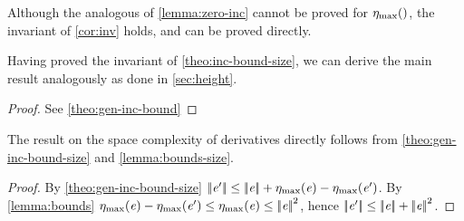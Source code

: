 Although the analogous of \cref{lemma:zero-inc} cannot be proved for ${\eta_{\max}}({})$, the invariant of \cref{cor:inv} holds, and can be proved directly.

Having proved the invariant of \cref{theo:inc-bound-size}, we can derive the main result analogously as done in \cref{sec:height}.
\begin{proof}
 See \cref{theo:gen-inc-bound}
\end{proof}

The result on the space complexity of derivatives directly follows from  \cref{theo:gen-inc-bound-size} and \cref{lemma:bounds-size}.


\begin{proof}
 By \cref{theo:gen-inc-bound-size} ${{\mid\!\mid}}{\mathit {e}'}{{\mid\!\mid}}\leq{{\mid\!\mid}}{\ensuremath{\mathit {e}}}{{\mid\!\mid}}+{\eta_{\max}}({\mathit {e}})-{\eta_{\max}}({\mathit {e}'})$. By \cref{lemma:bounds}
 ${\eta_{\max}}({\mathit {e}})-{\eta_{\max}}({\mathit {e}'})\leq{\eta_{\max}}({\mathit {e}})\leq{{\mid\!\mid}}{\ensuremath{\mathit {e}}}{{\mid\!\mid}}^2$, hence
 ${{\mid\!\mid}}{\mathit {e}'}{{\mid\!\mid}}\leq{{\mid\!\mid}}{\ensuremath{\mathit {e}}}{{\mid\!\mid}}+{{\mid\!\mid}}{\mathit {e}}{{\mid\!\mid}}^2$.
\end{proof}

